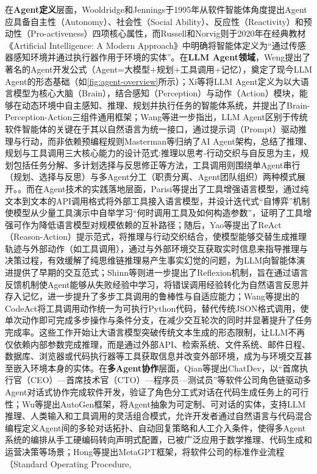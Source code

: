 在\textbf{Agent定义}层面，Wooldridge和Jennings\cite{wooldridge1995intelligent}于1995年从软件智能体角度提出Agent应具备自主性（Autonomy）、社会性（Social Ability）、反应性（Reactivity）和预动性（Pro-activeness）四项核心属性，而Russell和Norvig\cite{russell2020artificial}则于2020年在经典教材《Artificial Intelligence: A Modern Approach》中明确将智能体定义为“通过传感器感知环境并通过执行器作用于环境的实体”。在\textbf{LLM Agent领域}，Weng\cite{weng2023agent}提出了著名的Agent开发公式（Agent=大模型+规划+工具调用+记忆），奠定了现今LLM Agent的形态基础（如\autoref{fig:agent-overview}所示）；Xi等\cite{xi2025rise}将LLM Agent定义为以大语言模型为核心大脑（Brain），结合感知（Perception）与动作（Action）模块，能够在动态环境中自主感知、推理、规划并执行任务的智能体系统，并提出了Brain-Perception-Action三组件通用框架；Wang等\cite{wang2024survey}进一步指出，LLM Agent区别于传统软件智能体的关键在于其以自然语言为统一接口，通过提示词（Prompt）驱动推理与行动，而非依赖预编程规则Masterman等\cite{masterman2024landscape}归纳了AI Agent架构，总结了推理、规划与工具调用三大核心能力的设计范式:推理以思考-行动交织与自反思为主，规划包括任务分解、多计划选择与反思修正等方法，工具调用则围绕单Agent串行（规划、选择与反思）与多Agent分工（职责分离、Agent团队组织）两种模式展开。。而在Agent技术的实践落地层面，Parisi等\cite{parisi2022talm}提出了工具增强语言模型，通过纯文本到文本的API调用格式将外部工具接入语言模型，并设计迭代式“自博弈”机制使模型从少量工具演示中自举学习“何时调用工具及如何构造参数”，证明了工具增强可作为降低语言模型对规模依赖的互补路径；随后，Yao等\cite{yao2023react}提出了ReAct（Reason-Action）提示范式，将推理与行动交织结合，使模型能够交替生成推理轨迹与外部动作（如工具调用），通过与外部环境交互获取实时信息来指导推理与决策过程，有效缓解了纯思维链推理易产生事实幻觉的问题，为LLM向智能体演进提供了早期的交互范式；Shinn等\cite{shinn2023reflexion}则进一步提出了Reflexion机制，旨在通过语言反馈机制使Agent能够从失败经验中学习，将错误调用经验转化为自然语言反思并存入记忆，进一步提升了多步工具调用的鲁棒性与自适应能力；Wang等提出的\cite{wang2024codeact}CodeAct将工具调用动作统一为可执行Python代码，替代传统JSON格式调用，使单次动作即可完成多步操作与条件分支，在减少交互轮次的同时并显著提升了任务完成率。这些工作开始让大语言模型突破传统文本生成的形态限制，让LLM不再仅依赖内部参数完成推理，而是通过外部API、检索系统、文件系统、邮件日程、数据库、浏览器或代码执行器等工具获取信息并改变外部环境，成为与环境交互甚至嵌入环境本身的实体。在\textbf{多Agent协作}层面，Qian等\cite{qian2024chatdev}提出ChatDev，以“首席执行官（CEO）—首席技术官（CTO）—程序员—测试员”等软件公司角色链驱动多Agent对话式协作完成软件开发，验证了角色分工式对话在代码生成任务上的可行性；Wu等\cite{wu2024autogen}提出AutoGen框架，将Agent抽象为可定制、可对话的实体，支持LLM推理、人类输入和工具调用的灵活组合模式，允许开发者通过自然语言与代码混合编程定义Agent间的多轮对话拓扑、自动回复策略和人工介入条件，使得多Agent系统的编排从手工硬编码转向声明式配置，已被广泛应用于数学推理、代码生成和运营决策等场景；Hong等\cite{hong2024metagpt}提出MetaGPT框架，将软件公司的标准作业流程（Standard Operating Procedure, 